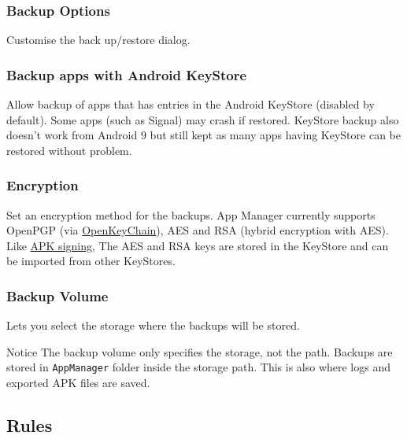 \subsubsection{Backup Options}\label{subsubsec:settings-backup-options} %
Customise the back up/restore dialog.

\subsubsection{Backup apps with Android KeyStore} %
Allow backup of apps that has entries in the Android KeyStore (disabled by default).
Some apps (such as Signal) may crash if restored.
KeyStore backup also doesn't work from Android 9 but still kept as many apps having KeyStore can be restored without problem.

\subsubsection{Encryption}\label{subsubsec:settings-encryption} %
Set an encryption method for the backups.
App Manager currently supports OpenPGP (via
\href{https://f-droid.org/packages/org.sufficientlysecure.keychain/}{OpenKeyChain}), AES and RSA (hybrid encryption with
AES).
Like \hyperref[subsec:apk-signing]{APK signing}, The AES and RSA keys are stored in the KeyStore and can be imported
from other KeyStores.

\subsubsection{Backup Volume}\label{subsubsec:backup-volume} %
Lets you select the storage where the backups will be stored.

\begin{tip}{Notice}
    The backup volume only specifies the storage, not the path.
    Backups are stored in \texttt{AppManager} folder inside the storage path.
    This is also where logs and exported APK files are saved.
\end{tip}

\subsection{Rules}\label{subsec:rules} %

